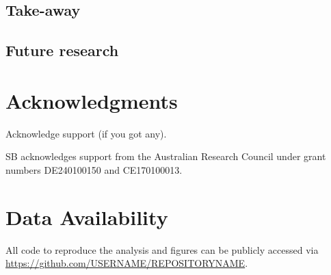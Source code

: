 \documentclass[twocolumn,apj,numberedappendix,appendixfloats]{openjournal}
\begin{document}
\subsection{Take-away} \label{sec:conclusions_takeaway}

\subsection{Future research} \label{sec:conclusions_future_research}

\clearpage

\section*{Acknowledgments}

Acknowledge support (if you got any).

SB acknowledges support from the Australian Research Council under grant numbers DE240100150 and CE170100013.

\section*{Data Availability}

All code to reproduce the analysis and figures can be publicly accessed via \url{https://github.com/USERNAME/REPOSITORYNAME}.






\end{document}
